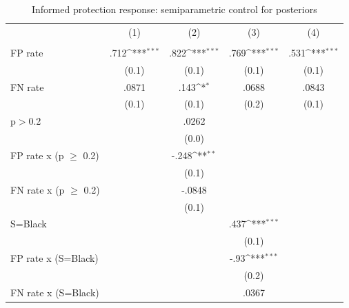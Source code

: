 \begin{table}[htbp]\centering
\def\sym#1{\ifmmode^{#1}\else\(^{#1}\)\fi}
\caption{Informed protection response: semiparametric control for posteriors}
\begin{tabular}{l*{4}{c}}
\hline\hline
                &\multicolumn{1}{c}{(1)}&\multicolumn{1}{c}{(2)}&\multicolumn{1}{c}{(3)}&\multicolumn{1}{c}{(4)}\\
                &\multicolumn{1}{c}{}&\multicolumn{1}{c}{}&\multicolumn{1}{c}{}&\multicolumn{1}{c}{}\\
\hline
FP rate         &     .712\sym{***}&     .822\sym{***}&     .769\sym{***}&     .531\sym{***}\\
                &    (0.1)         &    (0.1)         &    (0.1)         &    (0.1)         \\
FN rate         &    .0871         &     .143\sym{*}  &    .0688         &    .0843         \\
                &    (0.1)         &    (0.1)         &    (0.2)         &    (0.1)         \\
p$>$0.2         &                  &    .0262         &                  &                  \\
                &                  &    (0.0)         &                  &                  \\
FP rate x (p $\geq$ 0.2)&                  &    -.248\sym{**} &                  &                  \\
                &                  &    (0.1)         &                  &                  \\
FN rate x (p $\geq$ 0.2)&                  &   -.0848         &                  &                  \\
                &                  &    (0.1)         &                  &                  \\
S=Black         &                  &                  &     .437\sym{***}&                  \\
                &                  &                  &    (0.1)         &                  \\
FP rate x (S=Black)&                  &                  &     -.93\sym{***}&                  \\
                &                  &                  &    (0.2)         &                  \\
FN rate x (S=Black)&                  &                  &    .0367         &                  \\

\end{tabular}
\end{table}
